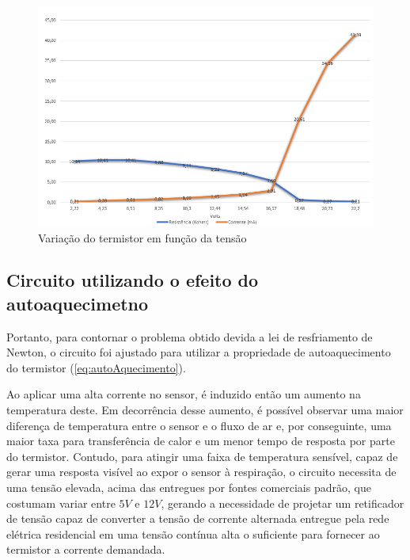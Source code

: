 \begin{figure}[h!]
	\begin{center}
		\includegraphics[width=1\linewidth]{images/variacao_resistencia_termistor.png}
		\caption{Variação do termistor em função da tensão}
		\label{fig:variacao_termistor}
	\end{center}
\end{figure}


\subsection{Circuito utilizando o efeito do autoaquecimetno}

Portanto, para contornar o problema obtido devida a lei de resfriamento de Newton, o circuito foi ajustado para utilizar a propriedade de autoaquecimento do termistor (\ref{eq:autoAquecimento}).  
 
Ao aplicar uma alta corrente no sensor, é induzido então um aumento na temperatura deste. Em decorrência desse aumento, é possível observar uma maior diferença de temperatura entre o sensor e o fluxo de ar e, por conseguinte, uma maior taxa para transferência de calor e um menor tempo de resposta por parte do termistor. Contudo, para atingir uma faixa de temperatura sensível, capaz de gerar uma resposta visível ao expor o sensor à respiração, o circuito necessita de uma tensão elevada, acima das entregues por fontes comerciais padrão, que costumam variar entre $5V$ e $12V$, gerando a necessidade de projetar um retificador de tensão capaz de converter a tensão de corrente alternada entregue pela rede elétrica residencial em uma tensão contínua alta o suficiente para fornecer ao termistor a corrente demandada.
 

